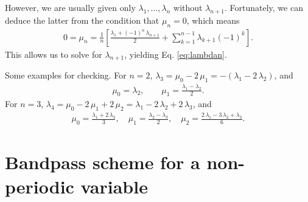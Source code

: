 \documentclass[reprint, floatfix]{revtex4-1}
\begin{document}
{  However, we are usually given only $\lambda_1, \dots, \lambda_n$
  without $\lambda_{n + 1}$.
  Fortunately, we can deduce the latter from
  the condition that $\mu_n = 0$, which means
  $$
  \begin{aligned}
    0 = \mu_n
    =
    \frac{1}{n}
    \left[
      \frac{ \lambda_1 + (-1)^n \, \lambda_{n+1} }
           {               2                     }
      +
      \sum_{ k = 1 }^{ n - 1 }
      \lambda_{k+1} (-1)^k
    \right].
  \end{aligned}
  $$
  This allows us to solve for $\lambda_{ n + 1 }$,
  yielding Eq. \eqref{eq:lambdan}.


  Some examples for checking.
  For $n = 2$,
  $\lambda_3
  = \mu_0 - 2 \, \mu_1
  = -(\lambda_1 - 2 \, \lambda_2)$,
  and
  $$
  \begin{aligned}
  \mu_0
  =
  \lambda_2,
  \qquad
  \mu_1
  =
  \frac{ \lambda_1 - \lambda_2 }
       {           2           }
  .
  \end{aligned}
  $$
  For $n = 3$,
  $\lambda_4
  = \mu_0 - 2 \, \mu_1 + 2 \, \mu_2
  = \lambda_1 - 2 \, \lambda_2 + 2 \, \lambda_3$,
  and
  $$
  \begin{aligned}
  \mu_0
  =
  \frac{ \lambda_1 + 2 \, \lambda_3 } { 3 }
  ,
  \quad
  \mu_1
  =
  \frac{ \lambda_2 - \lambda_3 } { 2 }
  ,
  \quad
  \mu_2
  =
  \frac { 2 \, \lambda_1 - 3 \, \lambda_2 + \lambda_3 } { 6 }
  .
  \end{aligned}
  $$
}



\section{Bandpass scheme for a non-periodic variable}
\end{document}
